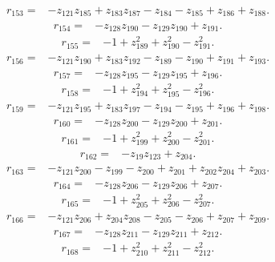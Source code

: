 \begin{align*}
 r_{153}={}&-z_{121}z_{185}+z_{183}z_{187}-z_{184}-z_{185}+z_{186}+z_{188} .
\end{align*}
\begin{align*}
 r_{154}={}&-z_{128}z_{190}-z_{129}z_{190}+z_{191} .
\end{align*}
\begin{align*}
 r_{155}={}&-1+z_{189}^{2}+z_{190}^{2}-z_{191}^{2} .
\end{align*}
\begin{align*}
 r_{156}={}&-z_{121}z_{190}+z_{183}z_{192}-z_{189}-z_{190}+z_{191}+z_{193} .
\end{align*}
\begin{align*}
 r_{157}={}&-z_{128}z_{195}-z_{129}z_{195}+z_{196} .
\end{align*}
\begin{align*}
 r_{158}={}&-1+z_{194}^{2}+z_{195}^{2}-z_{196}^{2} .
\end{align*}
\begin{align*}
 r_{159}={}&-z_{121}z_{195}+z_{183}z_{197}-z_{194}-z_{195}+z_{196}+z_{198} .
\end{align*}
\begin{align*}
 r_{160}={}&-z_{128}z_{200}-z_{129}z_{200}+z_{201} .
\end{align*}
\begin{align*}
 r_{161}={}&-1+z_{199}^{2}+z_{200}^{2}-z_{201}^{2} .
\end{align*}
\begin{align*}
 r_{162}={}&-z_{19}z_{123}+z_{204} .
\end{align*}
\begin{align*}
 r_{163}={}&-z_{121}z_{200}-z_{199}-z_{200}+z_{201}+z_{202}z_{204}+z_{203} .
\end{align*}
\begin{align*}
 r_{164}={}&-z_{128}z_{206}-z_{129}z_{206}+z_{207} .
\end{align*}
\begin{align*}
 r_{165}={}&-1+z_{205}^{2}+z_{206}^{2}-z_{207}^{2} .
\end{align*}
\begin{align*}
 r_{166}={}&-z_{121}z_{206}+z_{204}z_{208}-z_{205}-z_{206}+z_{207}+z_{209} .
\end{align*}
\begin{align*}
 r_{167}={}&-z_{128}z_{211}-z_{129}z_{211}+z_{212} .
\end{align*}
\begin{align*}
 r_{168}={}&-1+z_{210}^{2}+z_{211}^{2}-z_{212}^{2} .
\end{align*}

